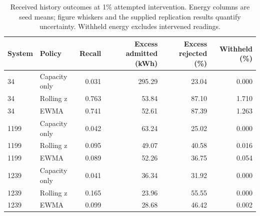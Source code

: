 \begin{table}[tb]\centering\small
\caption{Received history outcomes at 1\% attempted intervention. Energy columns are seed means; figure whiskers and the supplied replication results quantify uncertainty. Withheld energy excludes intervened readings.}\label{tab:siteenergy}
\begin{tabular}{@{}llrrrr@{}}\toprule
System & Policy & Recall & Excess admitted (kWh) & Excess rejected (\%) & Withheld (\%)\\\midrule
34 & Capacity only & 0.031 & 295.29 & 23.04 & 0.000\\
34 & Rolling z & 0.763 & 53.84 & 87.10 & 1.710\\
34 & EWMA & 0.741 & 52.61 & 87.39 & 1.263\\
1199 & Capacity only & 0.042 & 63.24 & 25.02 & 0.000\\
1199 & Rolling z & 0.095 & 49.07 & 40.58 & 0.016\\
1199 & EWMA & 0.089 & 52.26 & 36.75 & 0.054\\
1239 & Capacity only & 0.041 & 36.34 & 31.92 & 0.000\\
1239 & Rolling z & 0.165 & 23.96 & 55.55 & 0.000\\
1239 & EWMA & 0.099 & 28.68 & 46.42 & 0.002\\
\bottomrule\end{tabular}\end{table}
